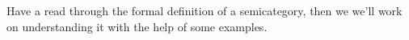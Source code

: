 Have a read through the formal definition of a semicategory, then we we'll work on understanding it with the help of some examples.
